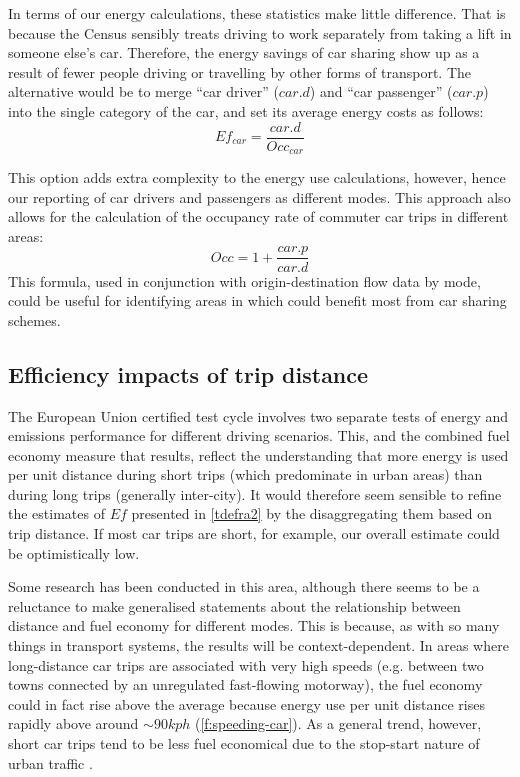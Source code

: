 In terms of our energy calculations, these statistics make little difference.
That is because the Census sensibly treats driving to work separately from
taking a lift in someone else's car. Therefore, the energy savings of
car sharing show up as a result of fewer people driving or travelling by
other forms of transport. The alternative would be to merge ``car driver''
($car.d$) and ``car passenger'' ($car.p$) into the single category of
the car, and set its average
energy costs as follows:
\begin{equation}
 Ef_{car} = \frac{car.d}{Occ_{car}}
\end{equation}

This option adds extra complexity to the energy use calculations,
however, hence our reporting of car drivers and passengers as different modes.
This approach also allows for the calculation of the occupancy rate of
commuter car trips in different areas:
\begin{equation}
 Occ = 1 + \frac{car.p}{car.d}
\end{equation}
This formula, used in conjunction with origin-destination flow data by mode,
could be useful for identifying areas in which could benefit most from
car sharing schemes.

\subsection{Efficiency impacts of trip distance}
The European Union certified test cycle involves two separate tests of energy
and emissions performance for different driving scenarios. This, and the
combined fuel economy measure that results, reflect the understanding that
more energy is used per unit distance during short trips (which predominate in
urban areas) than during long trips (generally inter-city). It would therefore
seem sensible to refine the estimates of $Ef$
presented in \cref{tdefra2} by the disaggregating them based on trip
distance. If most car trips are short, for example, our overall estimate could
be optimistically low.

Some research has been conducted in this area, although there seems to be a
 reluctance to make generalised statements about the relationship between
distance and fuel economy for different modes. This is because, as with so many
things in transport systems, the results will be context-dependent. In areas
where long-distance car trips are associated with very high speeds (e.g. between
two towns connected by an unregulated fast-flowing motorway), the fuel economy
could in fact rise above the average because energy use per unit distance rises
rapidly above around $\sim 90 kph$
(\cref{f:speeding-car}). As a general trend, however, short car trips
tend to be less fuel economical due to the stop-start nature of urban traffic
\citep{Anas2012-price-gas}.

